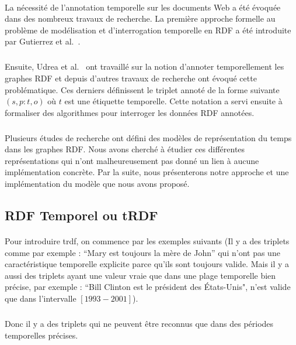 \paragraph{}
La nécessité de l’annotation temporelle sur les documents Web a été évoquée dans des nombreux travaux de recherche. La première approche formelle au problème de modélisation et d’interrogation temporelle en RDF a été introduite par Gutierrez et al.~\cite{gutierrez2005}.
\subparagraph{}
Ensuite, Udrea et al.~\cite{udrea2006} ont travaillé sur la notion d'annoter temporellement les graphes RDF et depuis d'autres travaux de recherche ont évoqué cette problématique.
Ces derniers définissent le triplet annoté de la forme suivante $(s,p:t,o)$ où $t$ est une étiquette temporelle. Cette notation a servi ensuite à formaliser des algorithmes pour interroger les données RDF annotées.
\subparagraph{}	
Plusieurs études de recherche ont défini des modèles de représentation du temps dans les graphes RDF. Nous avons cherché à étudier ces différentes représentations qui n'ont malheureusement pas donné un lien à aucune implémentation concrète. Par la suite, nous présenterons notre approche et une implémentation du modèle que nous avons proposé.  
\subsection{RDF Temporel ou tRDF}
\paragraph{}
Pour introduire \gls{trdf}, on commence par les exemples suivants (Il y a des triplets comme par exemple : ``Mary est toujours la mère de John'' qui n'ont pas une caractéristique temporelle explicite parce qu’ils sont toujours valide. Mais il y a aussi des triplets ayant une valeur vraie que dans une plage temporelle bien précise, par exemple : ``Bill Clinton est le président des États-Unis", n'est valide que dans l'intervalle $[1993-2001]$).
\subparagraph{}
Donc il y a des triplets qui ne peuvent être reconnus que dans des périodes temporelles précises.
